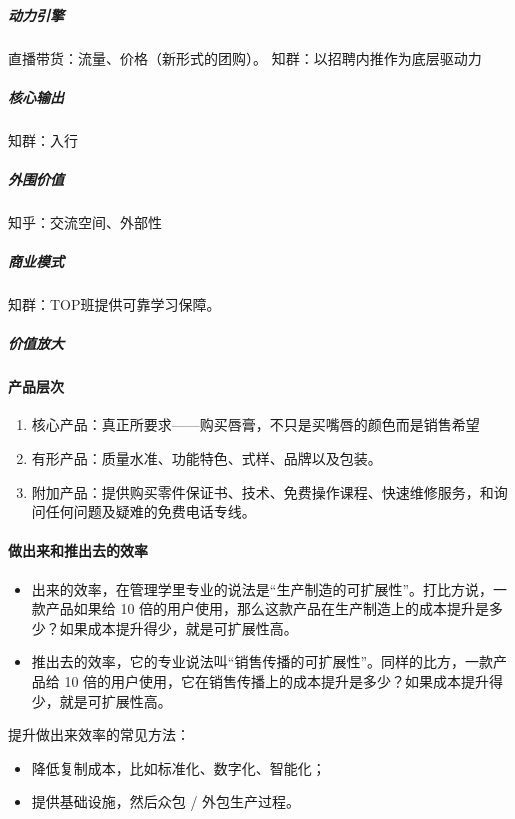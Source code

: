 \documentclass[letterpaper,11pt,english]{sphinxmanual}
\begin{document}
\subparagraph{动力引擎}
\label{\detokenize{chapter_introduction/Product:id13}}
直播带货：流量、价格（新形式的团购）。 知群：以招聘内推作为底层驱动力


\subparagraph{核心输出}
\label{\detokenize{chapter_introduction/Product:id14}}
知群：入行


\subparagraph{外围价值}
\label{\detokenize{chapter_introduction/Product:id15}}
知乎：交流空间、外部性


\subparagraph{商业模式}
\label{\detokenize{chapter_introduction/Product:id16}}
知群：TOP班提供可靠学习保障。


\subparagraph{价值放大}
\label{\detokenize{chapter_introduction/Product:id17}}

\paragraph{产品层次}
\label{\detokenize{chapter_introduction/Product:id18}}\begin{enumerate}
%
\item {} 
核心产品：真正所要求——购买唇膏，不只是买嘴唇的颜色而是销售希望

\item {} 
有形产品：质量水准、功能特色、式样、品牌以及包装。

\item {} 
附加产品：提供购买零件保证书、技术、免费操作课程、快速维修服务，和询问任何问题及疑难的免费电话专线。

\end{enumerate}


\paragraph{做出来和推出去的效率}
\label{\detokenize{chapter_introduction/Product:id19}}\begin{itemize}
\item {} 
出来的效率，在管理学里专业的说法是“生产制造的可扩展性”。打比方说，一款产品如果给
10
倍的用户使用，那么这款产品在生产制造上的成本提升是多少？如果成本提升得少，就是可扩展性高。

\item {} 
推出去的效率，它的专业说法叫“销售传播的可扩展性”。同样的比方，一款产品给
10
倍的用户使用，它在销售传播上的成本提升是多少？如果成本提升得少，就是可扩展性高。

\end{itemize}

提升做出来效率的常见方法：
\begin{itemize}
\item {} 
降低复制成本，比如标准化、数字化、智能化；

\item {} 
提供基础设施，然后众包 / 外包生产过程。

\end{itemize}
\end{document}
